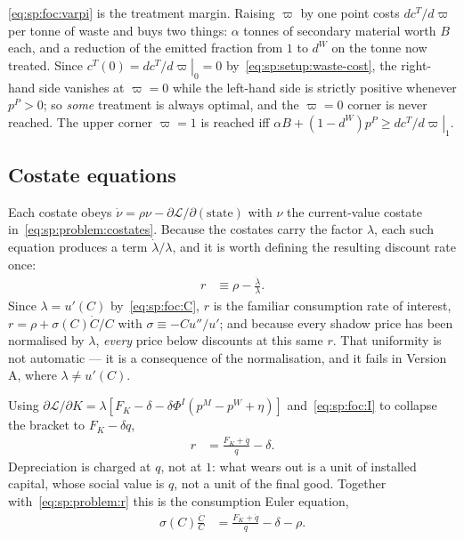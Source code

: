 \eqref{eq:sp:foc:varpi} is the treatment margin. Raising $\varpi$ by one point costs
$dc^T/d\varpi$ per tonne of waste and buys two things: $\alpha$ tonnes of secondary material worth
$B$ each, and a reduction of the emitted fraction from $1$ to $d^W$ on the tonne now treated. Since
$c^T(0)=\left.dc^T/d\varpi\right|_{0}=0$ by~\eqref{eq:sp:setup:waste-cost}, the right-hand side
vanishes at $\varpi=0$ while the left-hand side is strictly positive whenever $p^P>0$; so
\emph{some} treatment is always optimal, and the $\varpi=0$ corner is never reached. The upper
corner $\varpi=1$ is reached iff $\alpha B+\left(1-d^W\right)p^P\ge\left.dc^T/d\varpi\right|_{1}$.


\subsection{Costate equations}\label{sec:sp:problem:costates}

Each costate obeys $\dot\nu=\rho\nu-\partial\mathcal L/\partial(\text{state})$ with $\nu$ the
current-value costate in~\eqref{eq:sp:problem:costates}. Because the costates carry the factor
$\lambda$, each such equation produces a term $\dot\lambda/\lambda$, and it is worth defining the
resulting discount rate once:
\begin{align}
r &\equiv \rho-\frac{\dot\lambda}{\lambda}.
\label{eq:sp:problem:r}
\end{align}
Since $\lambda=u'(C)$ by~\eqref{eq:sp:foc:C}, $r$ is the familiar consumption rate of interest,
$r=\rho+\sigma(C)\dot C/C$ with $\sigma\equiv-Cu''/u'$; and because every shadow price has been
normalised by $\lambda$, \emph{every} price below discounts at this same $r$. That uniformity is not
automatic --- it is a consequence of the normalisation, and it fails in Version A, where
$\lambda\neq u'(C)$.

 Using $\partial\mathcal L/\partial K=\lambda\left[F_K-\delta-\delta\Phi^I
\left(p^M-p^W+\eta\right)\right]$ and~\eqref{eq:sp:foc:I} to collapse the bracket to
$F_K-\delta q$,
\begin{align}
r &= \frac{F_K+\dot q}{q}-\delta .
\label{eq:sp:costate:K}
\end{align}
Depreciation is charged at $q$, not at $1$: what wears out is a unit of installed capital, whose
social value is $q$, not a unit of the final good. Together with~\eqref{eq:sp:problem:r} this is the
consumption Euler equation,
\begin{align}
\sigma\left(C\right)\frac{\dot C}{C} &= \frac{F_K+\dot q}{q}-\delta-\rho .
\label{eq:sp:costate:euler}
\end{align}

